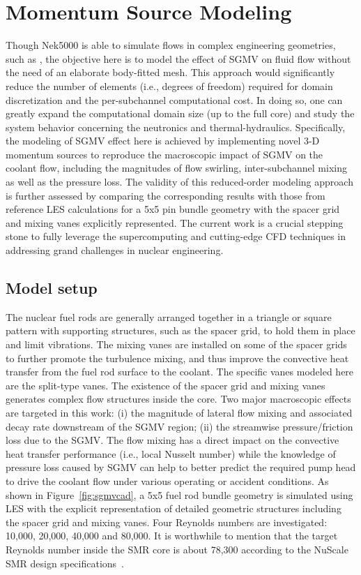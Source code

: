\section{Momentum Source Modeling}
\label{sec:msm}

Though Nek5000 is able to simulate flows in complex engineering geometries, such as \cite{Busco2019}, the objective here is to model the effect of SGMV on fluid flow without the need of an elaborate body-fitted mesh.
This approach would significantly reduce the number of elements (i.e., degrees of freedom) required for domain discretization and the per-subchannel computational cost.
In doing so, one can greatly expand the computational domain size (up to the full core) and study the system behavior concerning the neutronics and thermal-hydraulics.
Specifically, the modeling of SGMV effect here is achieved by implementing novel 3-D momentum sources to reproduce the macroscopic impact of SGMV on the coolant flow, including the magnitudes of flow swirling, inter-subchannel mixing as well as the pressure loss.
The validity of this reduced-order modeling approach is further assessed by comparing the corresponding results with those from reference LES calculations for a 5x5 pin bundle geometry with the spacer grid and mixing vanes explicitly represented.
The current work is a crucial stepping stone to fully leverage the supercomputing and cutting-edge CFD techniques in addressing grand challenges in nuclear engineering.


\subsection{Model setup}
\label{sec:msm1}

The nuclear fuel rods are generally arranged together in a triangle or square pattern with supporting structures, such as the spacer grid, to hold them in place and limit vibrations.
The mixing vanes are installed on some of the spacer grids to further promote the turbulence mixing, and thus improve the convective heat transfer from the fuel rod surface to the coolant.
The specific vanes modeled here are the split-type vanes.
The existence of the spacer grid and mixing vanes generates complex flow structures inside the core.
Two major macroscopic effects are targeted in this work:
(i) the magnitude of lateral flow mixing and associated decay rate downstream of the SGMV region;
(ii) the streamwise pressure/friction loss due to the SGMV.
The flow mixing has a direct impact on the convective heat transfer performance (i.e., local Nusselt number) while the knowledge of pressure loss caused by SGMV can help to better predict the required pump head to drive the coolant flow under various operating or accident conditions.
As shown in Figure~\ref{fig:sgmvcad}, a 5x5 fuel rod bundle geometry is simulated using LES with the explicit representation of detailed geometric structures including the spacer grid and mixing vanes.
Four Reynolds numbers are investigated: 10,000, 20,000, 40,000 and 80,000.
It is worthwhile to mention that the target Reynolds number inside the SMR core is about 78,300 according to the NuScale SMR design specifications~\citep{NuScale2018,Romano2020}.


